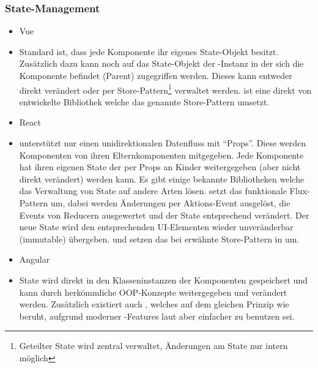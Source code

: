 \subsubsection{State-Management}
\begin{itemize}
    \item{Vue}
    \item[] Standard ist, dass jede Komponente ihr eigenes State-Objekt besitzt. Zusätzlich dazu kann noch auf das State-Objekt der -Instanz in der sich die Komponente befindet (Parent) zugegriffen werden. Dieses kann entweder direkt verändert oder per Store-Pattern\footnote{Geteilter State wird zentral verwaltet, Änderungen am State nur intern möglich} verwaltet werden.  ist eine direkt von  entwickelte Bibliothek welche das genannte Store-Pattern umsetzt.
    \item{React}
    \item[]  unterstützt nur einen unidirektionalen Datenfluss mit ``Props''. Diese werden Komponenten von ihren Elternkomponenten mitgegeben. Jede Komponente hat ihren eigenen State der per Props an Kinder weitergegeben (aber nicht direkt verändert) werden kann. Es gibt einige bekannte Bibliotheken welche das Verwaltung von State auf andere Arten lösen.  setzt das funktionale Flux-Pattern um, dabei werden Änderungen per Aktions-Event ausgelöst, die Events von Reducern ausgewertet und der State entsprechend verändert. Der neue State wird den entsprechenden UI-Elementen wieder unveränderbar (immutable) übergeben.  und  setzen das bei  erwähnte Store-Pattern in  um.
    \item{Angular}
    \item[] State wird direkt in den Klasseninstanzen der Komponenten gespeichert und kann durch herkömmliche OOP-Konzepte weitergegeben und verändert werden. Zusätzlich existiert auch , welches auf dem gleichen Prinzip wie  beruht, aufgrund moderner -Features laut  aber einfacher zu benutzen sei.
\end{itemize}

